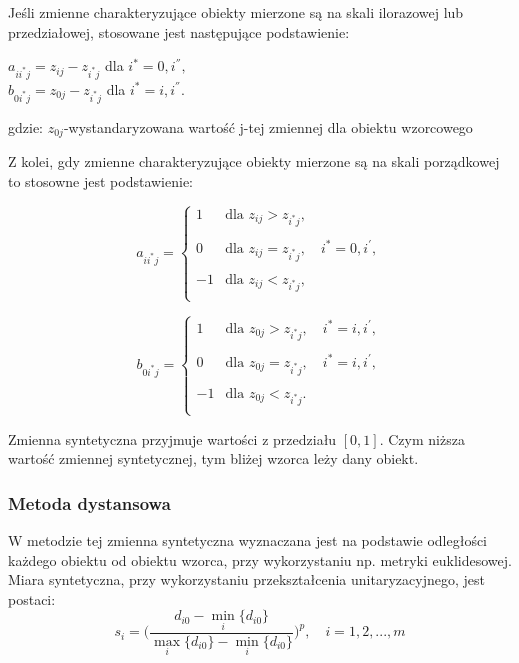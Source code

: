 \documentclass[12pt,a4paper]{report}
\begin{document}
Jeśli zmienne charakteryzujące obiekty mierzone są na skali ilorazowej lub przedziałowej, stosowane jest następujące podstawienie:
\begin{center}
$a_{ii^{*}j}=z_{ij} - z_{i^{*}j}$ dla $i^{*}=0,i^{''},$\\
$b_{0i^{*}j}=z_{0j}-z_{i^*j}$ dla $i^{*}=i,i^{''}$.
\end{center}
gdzie:
\newline
$z_{0j}$-wystandaryzowana wartość j-tej zmiennej dla obiektu wzorcowego

Z kolei, gdy zmienne charakteryzujące obiekty mierzone są na skali porządkowej to stosowne jest podstawienie:

\begin{equation}
a_{ii^{*}j}=\left\{ \begin{array}{lll}
1  & \textrm{dla  } z_{ij}>z_{i^{*}j},\\\\
0 & \textrm{dla } z_{ij}=z_{i^{*}j}, \quad i^{*}=0,i^{'},\\\\
-1 & \textrm{dla } z_{ij}<z_{i^{*}j},\\
\end{array} \right.
\end{equation}

\begin{equation}
b_{0i^{*}j}=\left\{ \begin{array}{lll}
1  & \textrm{dla  } z_{0j}>z_{i^{*}j}, \quad i^{*}=i,i^{'},\\\\
0 & \textrm{dla } z_{0j}=z_{i^{*}j},\quad i^{*}=i,i^{'},\\\\
-1 & \textrm{dla } z_{0j}<z_{i^{*}j}.\\
\end{array} \right.
\end{equation}

Zmienna syntetyczna przyjmuje wartości z przedziału $[0,1]$. Czym niższa wartość zmiennej syntetycznej, tym bliżej wzorca leży dany obiekt.

\subsubsection{Metoda dystansowa}
\noindent

W metodzie tej zmienna syntetyczna wyznaczana jest na podstawie odległości każdego obiektu od obiektu wzorca, przy wykorzystaniu np. metryki euklidesowej. Miara syntetyczna, przy wykorzystaniu przekształcenia unitaryzacyjnego, jest postaci: 
\newline
\begin{equation}
s_{i}=\bigg(\frac{d_{i0}-\min\limits_{i}\{d_{i0}\}}{\max\limits_{i}\{d_{i0}\}-\min\limits_{i}\{d_{i0}\}} \bigg)^{p}, \quad i=1,2,...,m
\end{equation}
\end{document}
